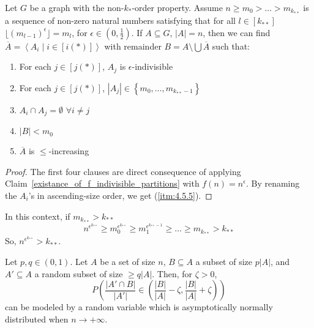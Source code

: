     \lemma[Claim 4.5]\label{existance_of_ordered_epsilon_indivisible_partitions}
    Let $G$ be a graph with the non-$k_{*}$-order property.
    Assume $n \geq m_0 > \dots > m_{k_{**}}$ is a sequence of non-zero natural numbers satisfying that for all $l \in [k_{**}]$
        $\lfloor (m_{l-1})^\epsilon \rfloor = m_l$, for $\epsilon \in (0, \frac{1}{2})$.
    If $A \subseteq G$, $|A| = n$, then we can find $\overline{A} = \left< A_i \mid i \in [i(*)] \right>$ with remainder
        $B = A \setminus \bigcup \overline{A}$ such that:
    \begin{enumerate}  %
        \item \label{itm:4.5.1} For each $j \in [j(*)]$, $A_j$ is $\epsilon$-indivisible
        \item \label{itm:4.5.2} For each $j \in [j(*)]$, $|A_j| \in \left\{ m_0, \dots, m_{k_{**}-1} \right\}$
        \item \label{itm:4.5.3} $A_i \cap A_j = \emptyset$ $\forall i \neq j$
        \item \label{itm:4.5.4} $|B| < m_0$
        \item \label{itm:4.5.5} $\overline{A}$ is $\leq$-increasing
    \end{enumerate}
        \begin{proof}
            The first four clauses are direct consequence of applying Claim~\ref{existance_of_f_indivisible_partitions}
                with $f(n) = n^\epsilon$.
            By renaming the $A_i$'s in ascending-size order, we get (\ref{itm:4.5.5}).
        \end{proof}


    \remark
    In this context, if $m_{k_{**}} > k_{**}$
    \[
        n^{\epsilon^{k_{**}}} \geq m_0^{\epsilon^{k_{**}}} \geq m_1^{\epsilon^{k_{**}-1}} \geq \dots \geq m_{k_{**}} > k_{**}
    \]
    So, $n^{\epsilon^{k_{**}}} > k_{**}$.

    \lemma[Fact 5.9]\label{fact_5.9}
        Let $p,q \in \left( 0,1 \right)$.
        Let $A$ be a set of size $n$, $B \subseteq A$ a subset of size $p|A|$, and $A' \subseteq A$ a random subset
        of size $\geq q|A|$. %
        Then, for $\zeta > 0$,
        $$
            P\left( \frac{\left| A' \cap B \right|}{\left| A' \right|} \in
                 \left( \frac{\left| B \right|}{\left| A \right|} -
                 \zeta, \frac{\left| B \right|}{\left| A \right|} + \zeta \right) \right)
        $$
        can be modeled by a random variable which is asymptotically normally distributed when $n \to +\infty$.

